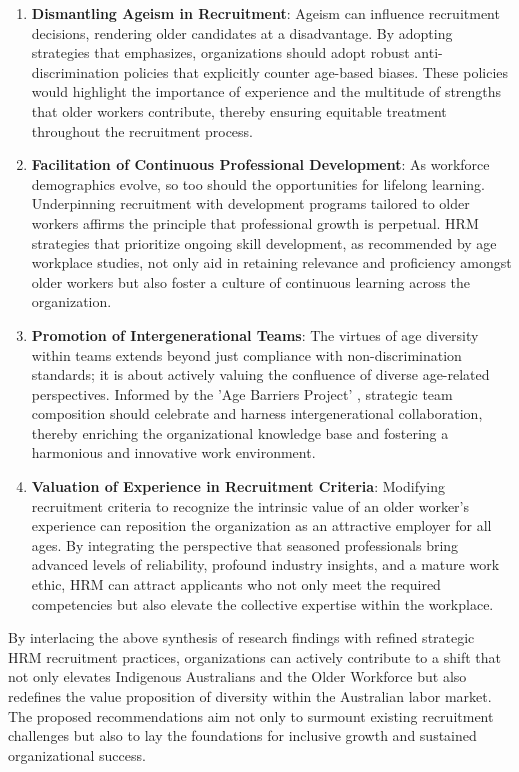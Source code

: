 \documentclass{article}
\begin{document}
\begin{enumerate}
    \item \textbf{Dismantling Ageism in Recruitment}: Ageism can influence recruitment decisions, rendering older candidates at a disadvantage. By adopting strategies that \textcite{marchiondoDevelopmentValidationWorkplace2016} emphasizes, organizations should adopt robust anti-discrimination policies that explicitly counter age-based biases. These policies would highlight the importance of experience and the multitude of strengths that older workers contribute, thereby ensuring equitable treatment throughout the recruitment process.

    \item \textbf{Facilitation of Continuous Professional Development}: As workforce demographics evolve, so too should the opportunities for lifelong learning. Underpinning recruitment with development programs tailored to older workers affirms the principle that professional growth is perpetual. HRM strategies that prioritize ongoing skill development, as recommended by age workplace studies, not only aid in retaining relevance and proficiency amongst older workers but also foster a culture of continuous learning across the organization.

    \item \textbf{Promotion of Intergenerational Teams}: The virtues of age diversity within teams extends beyond just compliance with non-discrimination standards; it is about actively valuing the confluence of diverse age-related perspectives. Informed by the 'Age Barriers Project' \parencite{walkerCombatingAgeDiscrimination1999}, strategic team composition should celebrate and harness intergenerational collaboration, thereby enriching the organizational knowledge base and fostering a harmonious and innovative work environment.

    \item \textbf{Valuation of Experience in Recruitment Criteria}: Modifying recruitment criteria to recognize the intrinsic value of an older worker's experience can reposition the organization as an attractive employer for all ages. By integrating the perspective that seasoned professionals bring advanced levels of reliability, profound industry insights, and a mature work ethic, HRM can attract applicants who not only meet the required competencies but also elevate the collective expertise within the workplace.
\end{enumerate}

By interlacing the above synthesis of research findings with refined strategic HRM recruitment practices, organizations can actively contribute to a shift that not only elevates Indigenous Australians and the Older Workforce but also redefines the value proposition of diversity within the Australian labor market. The proposed recommendations aim not only to surmount existing recruitment challenges but also to lay the foundations for inclusive growth and sustained organizational success.
\end{document}
